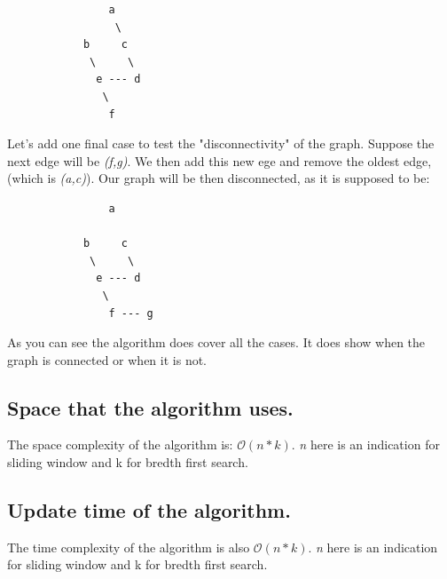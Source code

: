 \documentclass[11pt,a4paper,english]{article}
\begin{document}
        \begin{verbatim}
                a
                 \
            b     c
             \     \
              e --- d
               \
                f
        \end{verbatim}
        Let's add one final case to test the "disconnectivity" of the graph. Suppose the next edge will be \textit{(f,g)}. We then add this new ege and remove the oldest edge, (which is \textit{(a,c)}). Our graph will be then disconnected, as it is supposed to be:
        \begin{verbatim}
                a

            b     c
             \     \
              e --- d
               \
                f --- g
        \end{verbatim}
        As you can see the algorithm does cover all the cases. It does show when the graph is connected or when it is not.

      \subsection{Space that the algorithm uses.}
        The space complexity of the algorithm is: $\mathcal{O}(n * k)$. \textit{n} here is an indication for sliding window and k for bredth first search.

      \subsection{Update time of the algorithm.}
        The time complexity of the algorithm is also $\mathcal{O}(n * k)$. \textit{n} here is an indication for sliding window and k for bredth first search.
\end{document}
